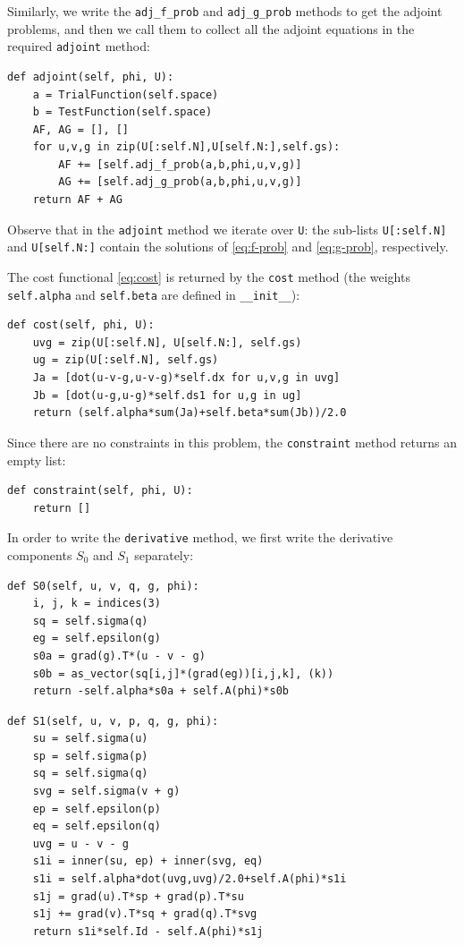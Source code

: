 \documentclass[iicol,pdflatex,sn-mathphys-ay]{sn-jnl}%
\theoremstyle{thmstyleone}%
\theoremstyle{thmstyletwo}%
\theoremstyle{thmstylethree}%
\begin{document}
Similarly, we write the \texttt{adj\_f\_prob} and \texttt{adj\_g\_prob} methods
to get the adjoint problems, and then we call them to collect all the adjoint equations
in the required \texttt{adjoint} method:  
\begin{lstlisting}
def adjoint(self, phi, U):
	a = TrialFunction(self.space)
	b = TestFunction(self.space)
	AF, AG = [], []
	for u,v,g in zip(U[:self.N],U[self.N:],self.gs):
		AF += [self.adj_f_prob(a,b,phi,u,v,g)]  
		AG += [self.adj_g_prob(a,b,phi,u,v,g)]
	return AF + AG
\end{lstlisting}
Observe that in the \texttt{adjoint} method we iterate over \texttt{U}:
the sub-lists \texttt{U[:self.N]} and \texttt{U[self.N:]} 
contain the solutions of \eqref{eq:f-prob} and \eqref{eq:g-prob}, respectively.

The cost functional \eqref{eq:cost} is returned by the \texttt{cost} method
(the weights \texttt{self.alpha} and \texttt{self.beta} are defined in \texttt{\_\_init\_\_}):
\begin{lstlisting}
def cost(self, phi, U):
	uvg = zip(U[:self.N], U[self.N:], self.gs)
	ug = zip(U[:self.N], self.gs)
	Ja = [dot(u-v-g,u-v-g)*self.dx for u,v,g in uvg]
	Jb = [dot(u-g,u-g)*self.ds1 for u,g in ug]
	return (self.alpha*sum(Ja)+self.beta*sum(Jb))/2.0
\end{lstlisting}

Since there are no constraints in this problem,
the \texttt{constraint} method returns an empty list:
\begin{lstlisting}
def constraint(self, phi, U):
	return []
\end{lstlisting}

In order to write the \texttt{derivative} method,
we first write the derivative components $S_0$ and $S_1$ separately:
\begin{lstlisting}
def S0(self, u, v, q, g, phi):
	i, j, k = indices(3)
	sq = self.sigma(q)
	eg = self.epsilon(g)
	s0a = grad(g).T*(u - v - g)
	s0b = as_vector(sq[i,j]*(grad(eg))[i,j,k], (k))
	return -self.alpha*s0a + self.A(phi)*s0b	
\end{lstlisting}
\begin{lstlisting}
def S1(self, u, v, p, q, g, phi):
	su = self.sigma(u)
	sp = self.sigma(p)
	sq = self.sigma(q)
	svg = self.sigma(v + g)
	ep = self.epsilon(p)
	eq = self.epsilon(q)
	uvg = u - v - g
	s1i = inner(su, ep) + inner(svg, eq)
	s1i = self.alpha*dot(uvg,uvg)/2.0+self.A(phi)*s1i
	s1j = grad(u).T*sp + grad(p).T*su 
	s1j += grad(v).T*sq + grad(q).T*svg
	return s1i*self.Id - self.A(phi)*s1j
\end{lstlisting}
\end{document}
